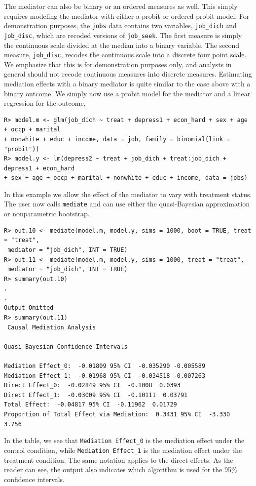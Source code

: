 \documentclass[11pt,letterpaper]{article}
\theoremstyle{plain}
\begin{document}
The mediator can also be binary or an ordered measures as well.  This
simply requires modeling the mediator with either a probit or ordered
probit model.  For demonstration purposes, the \texttt{jobs} data
contains two variables, \texttt{job\_dich} and \texttt{job\_disc},
which are recoded versions of \texttt{job\_seek}.  The first measure
is simply the continuous scale divided at the median into a binary
variable.  The second measure, \texttt{job\_disc}, recodes the
continuous scale into a discrete four point scale.  We emphasize that
this is for demonstration purposes only, and analysts in general
should not recode continuous measures into discrete measures.
Estimating mediation effects with a binary mediator is quite similar
to the case above with a binary outcome.  We simply now use a probit
model for the mediator and a linear regression for the outcome,
\begin{verbatim}
R> model.m <- glm(job_dich ~ treat + depress1 + econ_hard + sex + age + occp + marital
+ nonwhite + educ + income, data = job, family = binomial(link = "probit"))
R> model.y <- lm(depress2 ~ treat + job_dich + treat:job_dich + depress1 + econ_hard
+ sex + age + occp + marital + nonwhite + educ + income, data = jobs)
\end{verbatim}

In this example we allow the effect of the mediator to vary with
treatment status.  The user now calls \texttt{mediate} and can use
either the quasi-Bayesian approximation or nonparametric bootstrap.
\begin{verbatim}
R> out.10 <- mediate(model.m, model.y, sims = 1000, boot = TRUE, treat = "treat",
 mediator = "job_dich", INT = TRUE)
R> out.11 <- mediate(model.m, model.y, sims = 1000, treat = "treat",
 mediator = "job_dich", INT = TRUE)
R> summary(out.10)
.
.
Output Omitted
R> summary(out.11)
 Causal Mediation Analysis

Quasi-Bayesian Confidence Intervals

Mediation Effect_0:  -0.01809 95% CI  -0.035290 -0.005589
Mediation Effect_1:  -0.01968 95% CI  -0.034518 -0.007263
Direct Effect_0:  -0.02849 95% CI  -0.1008  0.0393
Direct Effect_1:  -0.03009 95% CI  -0.10111  0.03791
Total Effect:  -0.04817 95% CI  -0.11962  0.01729
Proportion of Total Effect via Mediation:  0.3431 95% CI  -3.330  3.756
\end{verbatim}

\noindent In the table, we see that \texttt{Mediation Effect\_0} is
the mediation effect under the control condition, while
\texttt{Mediation Effect\_1} is the mediation effect under the
treatment condition.  The same notation applies to the direct effects.
As the reader can see, the output also indicates which algorithm is
used for the 95\% confidence intervals.
\end{document}
